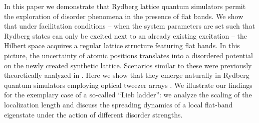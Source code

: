 \documentclass[prl,aps,twocolumn,showpacs,superscriptaddress,longbibliography]{revtex4-1}
\begin{document}
In this paper we demonstrate that Rydberg lattice quantum simulators \cite{Schauss_2015,Labuhn_2015,Bernien2017} permit the exploration of disorder phenomena in the presence of flat bands. We show that under facilitation conditions -- when the system parameters are set such that Rydberg states can only be excited next to an already existing excitation -- the Hilbert space acquires a regular lattice structure featuring flat bands. In this picture, the uncertainty of atomic positions translates into a disordered potential on the newly created synthetic lattice. Scenarios similar to these were previously theoretically analyzed in \cite{Leykam2017, Bodyfelt2014}. Here we show that they emerge naturally in Rydberg quantum simulators employing optical tweezer arrays \cite{Labuhn_2015,Jau2016,Bernien2017}. We illustrate our findings for the exemplary case of a so-called ``Lieb ladder'': we analyze the scaling of the localization length and discuss the spreading dynamics of a local flat-band eigenstate under the action of different disorder strengths.
\end{document}
